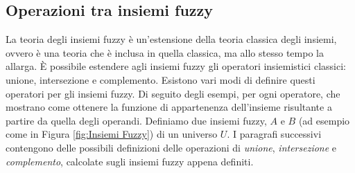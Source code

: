 \documentclass[a4paper,12pt]{report}
\begin{document}
\subsection*{Operazioni tra insiemi fuzzy}
La teoria degli insiemi fuzzy è un'estensione della teoria classica degli insiemi, ovvero è una teoria che è inclusa in quella classica, ma allo stesso tempo la allarga.
\`E possibile estendere agli insiemi fuzzy gli operatori insiemistici classici: unione, intersezione e complemento. Esistono vari modi di definire questi operatori per gli insiemi fuzzy. 
Di seguito degli esempi, per ogni operatore, che mostrano come ottenere la funzione di appartenenza dell'insieme risultante a partire da quella degli operandi.
\bigskip
Definiamo due insiemi fuzzy, $A$ e $B$ (ad esempio come in Figura \ref{fig:Insiemi Fuzzy}) di un universo $U$. I paragrafi successivi contengono delle possibili definizioni delle operazioni di \textit{unione}, \textit{intersezione} e \textit{complemento}, calcolate sugli insiemi fuzzy appena definiti.
\end{document}
